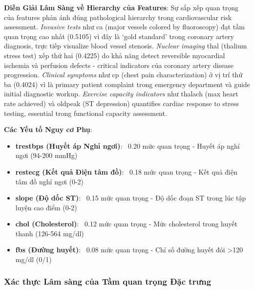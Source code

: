 \textbf{Diễn Giải Lâm Sàng về Hierarchy của Features}: Sự sắp xếp quan trọng của features phản ánh đúng pathological hierarchy trong cardiovascular risk assessment. \textit{Invasive tests} như ca (major vessels colored by fluoroscopy) đạt tầm quan trọng cao nhất (0.5105) vì đây là `gold standard' trong coronary artery diagnosis, trực tiếp visualize blood vessel stenosis. \textit{Nuclear imaging} thal (thalium stress test) xếp thứ hai (0.4225) do khả năng detect reversible myocardial ischemia và perfusion defects - critical indicators của coronary artery disease progression. \textit{Clinical symptoms} như cp (chest pain characterization) ở vị trí thứ ba (0.4024) vì là primary patient complaint trong emergency department và guide initial diagnostic workup. \textit{Exercise capacity indicators} như thalach (max heart rate achieved) và oldpeak (ST depression) quantifies cardiac response to stress testing, essential trong functional capacity assessment.

\textbf{Các Yếu tố Nguy cơ Phụ}:
\begin{itemize}
    \item \textbf{trestbps (Huyết áp Nghỉ ngơi)}: ~0.20 mức quan trọng - Huyết áp nghỉ ngơi (94-200 mmHg)
    \item \textbf{restecg (Kết quả Điện tâm đồ)}: ~0.18 mức quan trọng - Kết quả điện tâm đồ nghỉ ngơi (0-2)
    \item \textbf{slope (Độ dốc ST)}: ~0.15 mức quan trọng - Độ dốc đoạn ST trong lúc tập luyện cao điểm (0-2)
    \item \textbf{chol (Cholesterol)}: ~0.12 mức quan trọng - Mức cholesterol trong huyết thanh (126-564 mg/dl)
    \item \textbf{fbs (Đường huyết)}: ~0.08 mức quan trọng - Chỉ số đường huyết đói >120 mg/dl (0/1)
\end{itemize}

\subsubsection{Xác thực Lâm sàng của Tầm quan trọng Đặc trưng}

